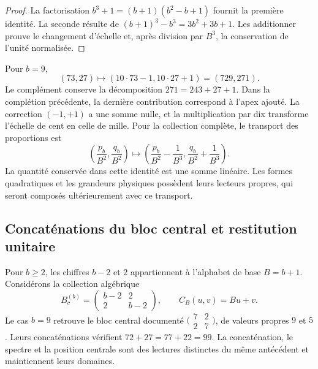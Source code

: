 \begin{proof}
La factorisation \(b^3+1=(b+1)(b^2-b+1)\) fournit la première
identité. La seconde résulte de
\((b+1)^3-b^3=3b^2+3b+1\). Les additionner prouve le changement d’échelle et,
après division par \(B^3\), la conservation de l’unité normalisée.
\end{proof}

Pour \(b=9\),
\begin{equation}
 (73,27)\longmapsto(10\cdot73-1,10\cdot27+1)=(729,271).
 \label{lib03:caso-729}
\end{equation}
Le complément conserve la décomposition \(271=243+27+1\). Dans la
complétion précédente, la dernière contribution correspond à l’apex
ajouté. La correction \((-1,+1)\) a une somme nulle, et la multiplication
par dix transforme l’échelle de cent en celle de mille. Pour la collection
complète, le transport des proportions est
\begin{equation}
 \left(\frac{p_b}{B^2},\frac{q_b}{B^2}\right)
 \longmapsto
 \left(\frac{p_b}{B^2}-\frac1{B^3},
       \frac{q_b}{B^2}+\frac1{B^3}\right).
 \label{lib03:fracciones-completacion}
\end{equation}
La quantité conservée dans cette identité est une somme linéaire. Les formes
quadratiques et les grandeurs physiques possèdent leurs lecteurs propres, qui
seront composés ultérieurement avec ce transport.

\subsection{Concaténations du bloc central et restitution unitaire}
\label{lib03:centro}

Pour \(b\geq2\), les chiffres \(b-2\) et \(2\) appartiennent à l’alphabet de
base \(B=b+1\). Considérons la collection algébrique
\begin{equation}
 B_c^{(b)}=\begin{pmatrix}b-2&2\\2&b-2\end{pmatrix},\qquad
 C_B(u,v)=Bu+v.
 \label{lib03:bloque-central}
\end{equation}
Le cas \(b=9\) retrouve le bloc central documenté
\(\bigl(\begin{smallmatrix}7&2\\2&7\end{smallmatrix}\bigr)\), de
valeurs propres \(9\) et \(5\). Leurs concaténations vérifient
\(72+27=77+22=99\). La concaténation, le spectre et la position centrale sont des
lectures distinctes du même antécédent et maintiennent leurs domaines.

